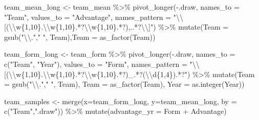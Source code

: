 \documentclass[
]{article}
\newenvironment{Shaded}{\begin{snugshade}}{\end{snugshade}}
\newcommand{\AttributeTok}[1]{\textcolor[rgb]{0.77,0.63,0.00}{#1}}
\newcommand{\FunctionTok}[1]{\textcolor[rgb]{0.00,0.00,0.00}{#1}}
\newcommand{\NormalTok}[1]{#1}
\newcommand{\OtherTok}[1]{\textcolor[rgb]{0.56,0.35,0.01}{#1}}
\newcommand{\SpecialCharTok}[1]{\textcolor[rgb]{0.00,0.00,0.00}{#1}}
\newcommand{\StringTok}[1]{\textcolor[rgb]{0.31,0.60,0.02}{#1}}
\begin{document}
\begin{Shaded}
\begin{Highlighting}[]
\NormalTok{team\_mean\_long }\OtherTok{\textless{}{-}}
\NormalTok{  team\_mean  }\SpecialCharTok{\%\textgreater{}\%}
  \FunctionTok{pivot\_longer}\NormalTok{(}\SpecialCharTok{{-}}\NormalTok{.draw, }\AttributeTok{names\_to =} \StringTok{"Team"}\NormalTok{, }\AttributeTok{values\_to =} \StringTok{"Advantage"}\NormalTok{,}
               \AttributeTok{names\_pattern =} \StringTok{"}\SpecialCharTok{\textbackslash{}\textbackslash{}}\StringTok{[(}\SpecialCharTok{\textbackslash{}\textbackslash{}}\StringTok{w\{1,10\}.}\SpecialCharTok{\textbackslash{}\textbackslash{}}\StringTok{w\{1,10\}.*?}\SpecialCharTok{\textbackslash{}\textbackslash{}}\StringTok{w\{1,10\}.*?),..*?}\SpecialCharTok{\textbackslash{}\textbackslash{}}\StringTok{]"}\NormalTok{) }\SpecialCharTok{\%\textgreater{}\%}
  \FunctionTok{mutate}\NormalTok{(}\AttributeTok{Team =} \FunctionTok{gsub}\NormalTok{(}\StringTok{"}\SpecialCharTok{\textbackslash{}\textbackslash{}}\StringTok{."}\NormalTok{,}\StringTok{" "}\NormalTok{, Team),}\AttributeTok{Team =} \FunctionTok{as\_factor}\NormalTok{(Team))}

\NormalTok{team\_form\_long }\OtherTok{\textless{}{-}}
\NormalTok{  team\_form }\SpecialCharTok{\%\textgreater{}\%}
  \FunctionTok{pivot\_longer}\NormalTok{(}\SpecialCharTok{{-}}\NormalTok{.draw, }\AttributeTok{names\_to =} \FunctionTok{c}\NormalTok{(}\StringTok{"Team"}\NormalTok{, }\StringTok{"Year"}\NormalTok{), }\AttributeTok{values\_to =} \StringTok{"Form"}\NormalTok{,}
               \AttributeTok{names\_pattern =} \StringTok{"}\SpecialCharTok{\textbackslash{}\textbackslash{}}\StringTok{[(}\SpecialCharTok{\textbackslash{}\textbackslash{}}\StringTok{w\{1,10\}.}\SpecialCharTok{\textbackslash{}\textbackslash{}}\StringTok{w\{1,10\}.*?}\SpecialCharTok{\textbackslash{}\textbackslash{}}\StringTok{w\{1,10\}.*?)\_.*?(}\SpecialCharTok{\textbackslash{}\textbackslash{}}\StringTok{d\{1,4\}).*?"}\NormalTok{) }\SpecialCharTok{\%\textgreater{}\%}
  \FunctionTok{mutate}\NormalTok{(}\AttributeTok{Team =} \FunctionTok{gsub}\NormalTok{(}\StringTok{"}\SpecialCharTok{\textbackslash{}\textbackslash{}}\StringTok{."}\NormalTok{,}\StringTok{" "}\NormalTok{, Team), }\AttributeTok{Team =} \FunctionTok{as\_factor}\NormalTok{(Team), }\AttributeTok{Year =} \FunctionTok{as.integer}\NormalTok{(Year))}

\NormalTok{team\_samples }\OtherTok{\textless{}{-}}
  \FunctionTok{merge}\NormalTok{(}\AttributeTok{x=}\NormalTok{team\_form\_long, }\AttributeTok{y=}\NormalTok{team\_mean\_long, }\AttributeTok{by =} \FunctionTok{c}\NormalTok{(}\StringTok{"Team"}\NormalTok{,}\StringTok{".draw"}\NormalTok{)) }\SpecialCharTok{\%\textgreater{}\%}
  \FunctionTok{mutate}\NormalTok{(}\AttributeTok{advantage\_yr =}\NormalTok{ Form }\SpecialCharTok{+}\NormalTok{ Advantage)}


\end{Highlighting}
\end{Shaded}
\end{document}
